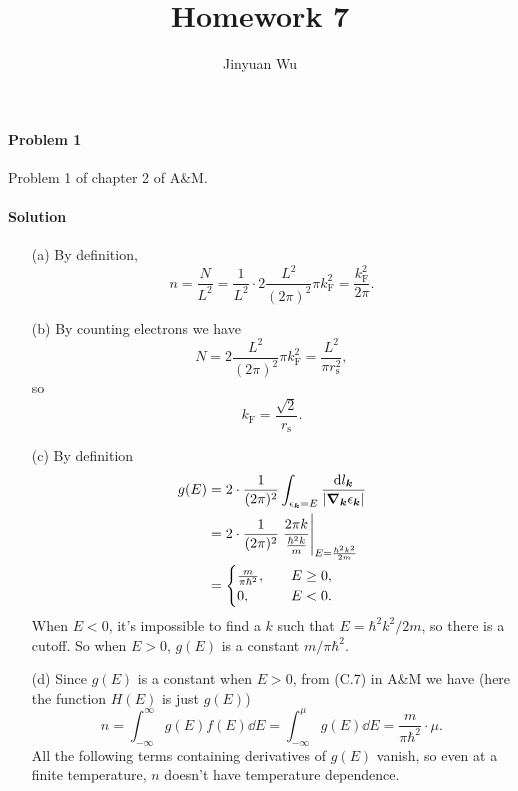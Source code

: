 \documentclass[hyperref, a4paper]{article}
\title{Homework 7}
\author{Jinyuan Wu}
\begin{document}
\maketitle

\paragraph{Problem 1} Problem 1 of chapter 2 of A\&M.

\paragraph{Solution} \begin{itemize}
\item[(a)] By definition, 
\begin{equation}
    n = \frac{N}{L^2} = \frac{1}{L^2} \cdot 2 \frac{L^2}{(2\pi)^2} \pi k_{\text{F}}^2
    = \frac{k_{\text{F}}^2}{2\pi}.
\end{equation}
\item[(b)] By counting electrons we have 
\[
    N = 2 \frac{L^2}{(2\pi)^2} \pi k_{\text{F}}^2 = \frac{L^2}{\pi r_{\text{s}}^2},
\]
so 
\begin{equation}
    k_{\text{F}} = \frac{\sqrt{2}}{r_{\text{s}}}.
\end{equation}

\item[(c)] By definition
\[
    \begin{aligned}
        g(E) &= 2 \cdot \frac{1}{(2\pi)^2} \int_{\epsilon_{\vb*{k}} = E} 
        \frac{\dd{l_{\vb*{k}}}}{\abs{\grad_{\vb*{k}} \epsilon_{\vb*{k}}}} \\
        &= 2 \cdot \frac{1}{(2\pi)^2} \eval{\frac{2\pi k}{\frac{\hbar^2 k}{m}}}_{ E = \frac{\hbar^2 k^2}{2m} } \\
        &= \begin{cases}
            \frac{m}{\pi \hbar^2}, & \quad E \geq 0, \\
            0                    , & \quad E < 0.
        \end{cases}
    \end{aligned}
\]
When $E < 0$, it's impossible to find a $k$ such that $E = \hbar^2 k^2 / 2m$,
so there is a cutoff.
So when $E > 0$, $g(E)$ is a constant $m / \pi \hbar^2$.

\item[(d)] Since $g(E)$ is a constant when $E > 0$,
from (C.7) in A\&M we have (here the function $H(E)$ is just $g(E)$)
\begin{equation}
    n = \int_{-\infty}^\infty g(E) f(E) \dd{E}  = \int_{-\infty}^\mu g(E) \dd{E} = 
    \frac{m}{\pi \hbar^2} \cdot \mu.
\end{equation}
All the following terms containing derivatives of $g(E)$ vanish, 
so even at a finite temperature,
$n$ doesn't have temperature dependence.


\end{itemize}
\end{document}
